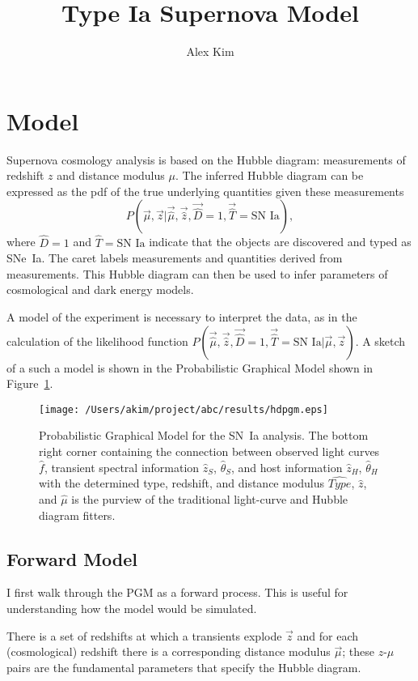\documentclass[preprint]{aastex}
\begin{document}
\title{Type Ia Supernova Model}
\author{Alex Kim}

\section{Model}
Supernova cosmology analysis is based on the Hubble diagram: measurements of
redshift $z$ and distance modulus $\mu$.  The inferred Hubble diagram
can be expressed as the pdf of the true underlying
quantities given these measurements 
\begin{equation}
P(\vec{\mu},\vec{z}| \vec{\hat{\mu}}, \vec{\hat{z}}, \vec{\hat{D}}=1, \vec{\hat{T}}=\text{SN~Ia}),
\end{equation}
where $\hat{D}=1$ and $\hat{T}=\text{SN~Ia}$ indicate that the objects are discovered and typed
as SNe~Ia.  
The caret labels measurements and quantities derived
from measurements.  This Hubble diagram can then be used to infer parameters
of cosmological and dark energy models.

A model of the experiment is necessary to interpret the data, as in the
calculation of the likelihood function $P(\vec{\hat{\mu}}, \vec{\hat{z}}, \vec{\hat{D}}=1, \vec{\hat{T}}=\text{SN~Ia}|\vec{\mu},\vec{z})$.
A sketch of a such a model is shown in the Probabilistic Graphical Model
shown in Figure~\ref{pgm:fig}.

\begin{figure}[htbp] %
   \centering
   \texttt{[image: /Users/akim/project/abc/results/hdpgm.eps]} 
   \caption{Probabilistic Graphical Model for the SN~Ia analysis.
   The bottom right corner containing the connection between observed light curves
   $\hat{f}$, transient spectral information $\hat{z}_S$, $\hat{\theta}_S$, and
   host information $\hat{z}_H$, $\hat{\theta}_H$ with the determined type, redshift, and distance
   modulus $\hat{\mathit{Type}}$, $\hat{z}$, and $\hat{\mu}$ is the purview of
   the traditional light-curve and Hubble diagram fitters.
   \label{pgm:fig}}
\end{figure}

\subsection{Forward Model}
I first walk through the PGM as a forward process.  This is useful for understanding
how the model would be simulated.

There is a set of redshifts
at which a transients explode $\vec{z}$ and for each (cosmological) redshift there is a corresponding distance
modulus $\vec{\mu}$; these $z$-$\mu$ pairs are the fundamental parameters that
specify the Hubble diagram.
\end{document}
